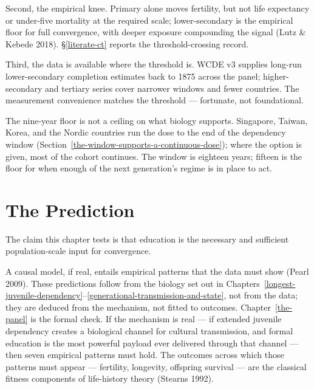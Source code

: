 \documentclass[12pt,letterpaper]{article}
\begin{document}
Second, the empirical knee. Primary alone moves fertility, but not
life expectancy or under-five mortality at the required scale;
lower-secondary is the empirical floor for full convergence, with
deeper exposure compounding the signal (Lutz \& Kebede 2018).
\S\ref{literate-ct} reports the threshold-crossing record.

Third, the data is available where the threshold is. WCDE v3
supplies long-run lower-secondary completion estimates back to 1875
across the panel; higher-secondary and tertiary series cover
narrower windows and fewer countries. The measurement convenience
matches the threshold --- fortunate, not foundational.

The nine-year floor is not a ceiling on what biology supports.
Singapore, Taiwan, Korea, and the Nordic countries run the dose to
the end of the dependency window
(Section~\ref{the-window-supports-a-continuous-dose}); where the
option is given, most of the cohort continues. The window is
eighteen years; fifteen is the floor for when enough of the next
generation's regime is in place to act.

\section{The Prediction}\label{the-prediction}

The claim this chapter tests is that education is the necessary and
sufficient population-scale input for convergence.

A causal model, if real, entails empirical patterns that the data
must show (Pearl 2009). These predictions follow from the biology
set out in Chapters~\ref{longest-juvenile-dependency}--\ref{generational-transmission-and-state},
not from the data; they are deduced from the mechanism, not fitted
to outcomes. Chapter~\ref{the-panel} is the formal check. If the
mechanism is real --- if extended juvenile dependency creates a
biological channel for cultural transmission, and formal education
is the most powerful payload ever delivered through that channel ---
then seven empirical patterns must hold. The outcomes across which
those patterns must appear --- fertility, longevity, offspring
survival --- are the classical fitness components of life-history
theory (Stearns 1992).
\end{document}
